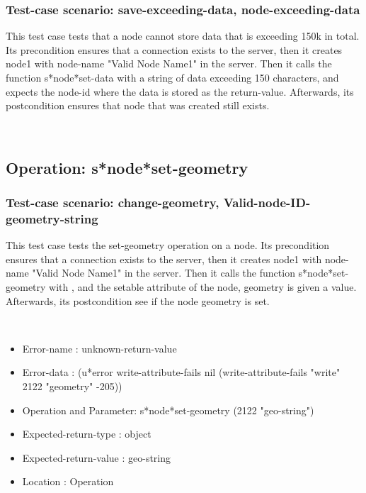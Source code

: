 \subsubsection {Test-case scenario: save-exceeding-data, node-exceeding-data}


This test case tests that a node cannot store data that is exceeding 150k in total.
Its precondition ensures that a connection exists to the server, then it creates node1 with node-name "Valid Node Name1" in the server.
Then it calls the function s*node*set-data  with a string of data exceeding 150 characters, and expects the node-id where the data is stored as the return-value.
Afterwards, its postcondition ensures that node that was created still exists.




\
\subsection {Operation: s*node*set-geometry}
\subsubsection {Test-case scenario: change-geometry, Valid-node-ID-geometry-string}


This test case tests the set-geometry operation on a node.
Its precondition ensures that a connection exists to the server, then it creates node1 with node-name "Valid Node Name1" in the server.
Then it calls the function s*node*set-geometry  with , and the setable attribute of the node, geometry is given a value.
Afterwards, its postcondition see if the node geometry is set.


\
\begin {itemize}
\item 	Error-name             : unknown-return-value
\item Error-data             : (u*error write-attribute-fails nil (write-attribute-fails "write" 2122 "geometry" -205))
\item Operation and Parameter: s*node*set-geometry (2122 "geo-string")
\item Expected-return-type   : object
\item Expected-return-value  : geo-string
\item Location               : Operation



\end {itemize}
